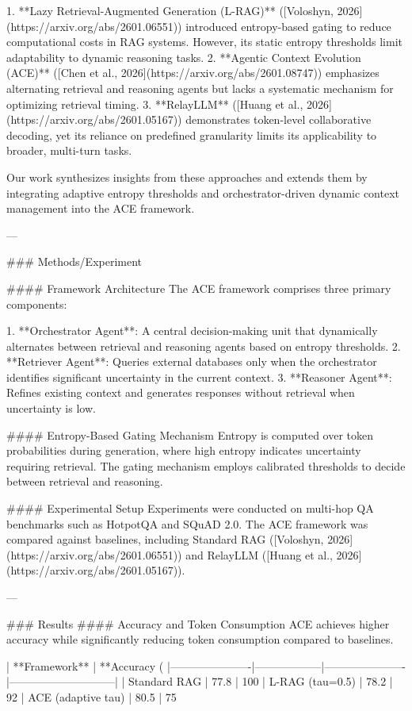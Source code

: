 1. **Lazy Retrieval-Augmented Generation (L-RAG)** ([Voloshyn, 2026](https://arxiv.org/abs/2601.06551)) introduced entropy-based gating to reduce computational costs in RAG systems. However, its static entropy thresholds limit adaptability to dynamic reasoning tasks.  
2. **Agentic Context Evolution (ACE)** ([Chen et al., 2026](https://arxiv.org/abs/2601.08747)) emphasizes alternating retrieval and reasoning agents but lacks a systematic mechanism for optimizing retrieval timing.  
3. **RelayLLM** ([Huang et al., 2026](https://arxiv.org/abs/2601.05167)) demonstrates token-level collaborative decoding, yet its reliance on predefined granularity limits its applicability to broader, multi-turn tasks.  

Our work synthesizes insights from these approaches and extends them by integrating adaptive entropy thresholds and orchestrator-driven dynamic context management into the ACE framework.

---

### Methods/Experiment  

#### Framework Architecture  
The ACE framework comprises three primary components:  

1. **Orchestrator Agent**: A central decision-making unit that dynamically alternates between retrieval and reasoning agents based on entropy thresholds.  
2. **Retriever Agent**: Queries external databases only when the orchestrator identifies significant uncertainty in the current context.  
3. **Reasoner Agent**: Refines existing context and generates responses without retrieval when uncertainty is low.  

#### Entropy-Based Gating Mechanism  
Entropy is computed over token probabilities during generation, where high entropy indicates uncertainty requiring retrieval. The gating mechanism employs calibrated thresholds to decide between retrieval and reasoning.  

#### Experimental Setup  
Experiments were conducted on multi-hop QA benchmarks such as HotpotQA and SQuAD 2.0. The ACE framework was compared against baselines, including Standard RAG ([Voloshyn, 2026](https://arxiv.org/abs/2601.06551)) and RelayLLM ([Huang et al., 2026](https://arxiv.org/abs/2601.05167)).  

---

### Results  
#### Accuracy and Token Consumption  
ACE achieves higher accuracy while significantly reducing token consumption compared to baselines.  

| **Framework**       | **Accuracy (%
|----------------------|------------------|----------------------|-----------------------------|  
| Standard RAG         | 77.8            | 100%
| L-RAG (tau=0.5)      | 78.2            | 92%
| ACE (adaptive tau)   | 80.5            | 75%

